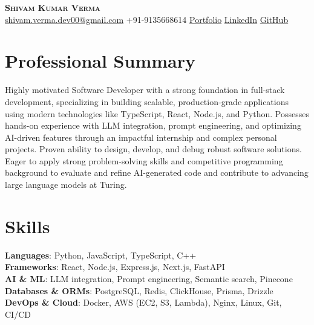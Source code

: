 \documentclass[letterpaper,10pt]{article}
\begin{document}
\begin{center}
  \textbf{\Huge \scshape Shivam Kumar Verma} \\ \vspace{4pt}
  \small \href{mailto:shivam.verma.dev00@gmail.com}{shivam.verma.dev00@gmail.com} \textbullet{} +91-9135668614 \textbullet{} \href{Portfolio}{Portfolio} \textbullet{} \href{LinkedIn}{LinkedIn} \textbullet{} \href{GitHub}{GitHub}
\end{center}

\section{Professional Summary}
\vspace{3pt}
\small{Highly motivated Software Developer with a strong foundation in full-stack development, specializing in building scalable, production-grade applications using modern technologies like TypeScript, React, Node.js, and Python. Possesses hands-on experience with LLM integration, prompt engineering, and optimizing AI-driven features through an impactful internship and complex personal projects. Proven ability to design, develop, and debug robust software solutions. Eager to apply strong problem-solving skills and competitive programming background to evaluate and refine AI-generated code and contribute to advancing large language models at Turing.}

\section{Skills}
\begin{itemize}[leftmargin=0.15in, label={}]
  \small{\item{
    \textbf{Languages}{: Python, JavaScript, TypeScript, C++} \\ \vspace{2pt}
    \textbf{Frameworks}{: React, Node.js, Express.js, Next.js, FastAPI} \\ \vspace{2pt}
    \textbf{AI \& ML}{: LLM integration, Prompt engineering, Semantic search, Pinecone} \\ \vspace{2pt}
    \textbf{Databases \& ORMs}{: PostgreSQL, Redis, ClickHouse, Prisma, Drizzle} \\ \vspace{2pt}
    \textbf{DevOps \& Cloud}{: Docker, AWS (EC2, S3, Lambda), Nginx, Linux, Git, CI/CD}
  }}
\end{itemize}
\end{document}
